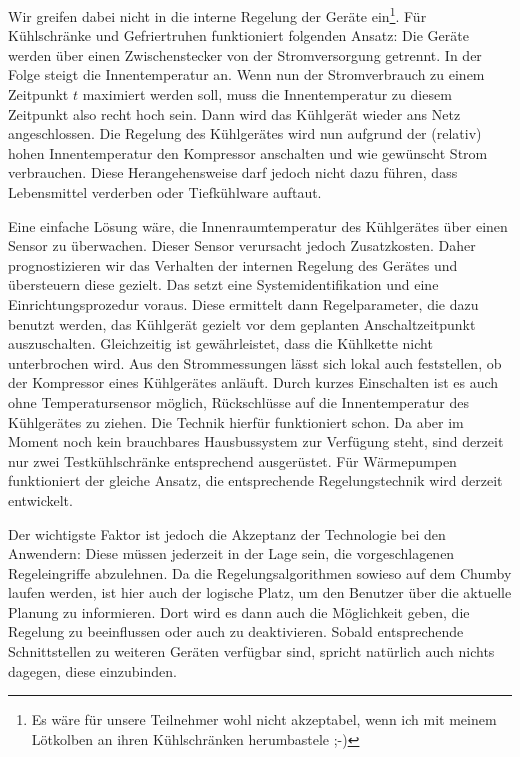 \documentclass[12pt,BCOR=8.5mm]{scrartcl}
\begin{document}
Wir greifen dabei nicht in die interne Regelung der Geräte
ein\footnote{Es wäre für unsere Teilnehmer wohl nicht akzeptabel, wenn
ich mit meinem Lötkolben an ihren Kühlschränken herumbastele ;-)}. Für
Kühlschränke und Gefriertruhen funktioniert folgenden Ansatz: Die
Geräte werden über einen Zwischenstecker von der Stromversorgung
getrennt. In der Folge steigt die Innentemperatur an. Wenn nun der
Stromverbrauch zu einem Zeitpunkt $t$ maximiert werden soll, muss die
Innentemperatur zu diesem Zeitpunkt also recht hoch sein. Dann wird das
Kühlgerät wieder ans Netz angeschlossen. Die Regelung des Kühlgerätes
wird nun aufgrund der (relativ) hohen Innentemperatur den Kompressor
anschalten und wie gewünscht Strom verbrauchen. Diese Herangehensweise
darf jedoch nicht dazu führen, dass Lebensmittel verderben oder
Tiefkühlware auftaut.

Eine einfache Lösung wäre, die Innenraumtemperatur des Kühlgerätes über
einen Sensor zu überwachen. Dieser Sensor verursacht jedoch
Zusatzkosten. Daher prognostizieren wir das Verhalten der internen
Regelung des Gerätes und übersteuern diese gezielt. Das setzt eine
Systemidentifikation und eine Einrichtungsprozedur voraus. Diese
ermittelt dann Regelparameter, die dazu benutzt werden, das Kühlgerät
gezielt vor dem geplanten Anschaltzeitpunkt auszuschalten. Gleichzeitig
ist gewährleistet, dass die Kühlkette nicht unterbrochen wird. Aus den
Strommessungen lässt sich lokal auch feststellen, ob der Kompressor
eines Kühlgerätes anläuft. Durch kurzes Einschalten ist es auch ohne
Temperatursensor möglich, Rückschlüsse auf die Innentemperatur des
Kühlgerätes zu ziehen. Die Technik hierfür funktioniert schon. Da aber
im Moment noch kein brauchbares Hausbussystem zur Verfügung steht, sind
derzeit nur zwei Testkühlschränke entsprechend ausgerüstet. Für
Wärmepumpen funktioniert der gleiche Ansatz, die entsprechende
Regelungstechnik wird derzeit entwickelt.

Der wichtigste Faktor ist jedoch die Akzeptanz der Technologie bei den
Anwendern: Diese müssen jederzeit in der Lage sein, die vorgeschlagenen
Regeleingriffe abzulehnen. Da die Regelungsalgorithmen sowieso auf dem
Chumby laufen werden, ist hier auch der logische Platz, um den Benutzer
über die aktuelle Planung zu informieren. Dort wird es dann auch die
Möglichkeit geben, die Regelung zu beeinflussen oder auch zu
deaktivieren. Sobald entsprechende Schnittstellen zu weiteren Geräten
verfügbar sind, spricht natürlich auch nichts dagegen, diese
einzubinden.
\end{document}

